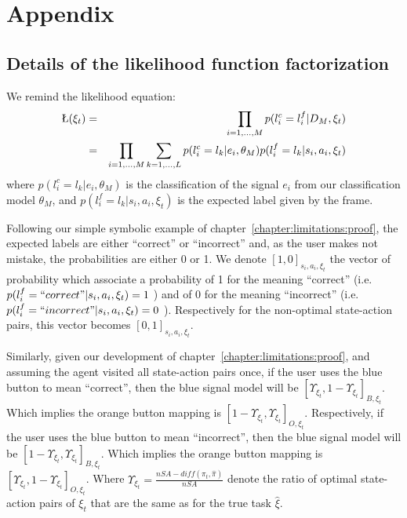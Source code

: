 
\chapter{Appendix}
\label{appendix}

\section{Details of the likelihood function factorization}
\label{appendix:proof}

We remind the likelihood equation:
%
\begin{eqnarray}
\L(\xi_t) &=& \prod_{i = 1,\ldots,M} p(l^c_i = l^f_i | D_M, \xi_t) \nonumber \\ 
&=& \prod_{i = 1,\ldots,M} \sum_{k = 1, \ldots, L} p(l^c_i = l_k | e_i, \theta_M) p(l^f_i = l_k | s_i, a_i, \xi_t) \nonumber
\end{eqnarray}
%
where $p(l^c_i = l_k | e_i, \theta_M)$ is the classification of the signal $e_i$ from our classification model $\theta_M$, and $p(l^f_i = l_k | s_i, a_i, \xi_t)$ is the expected label given by the frame.

Following our simple symbolic example of chapter~\ref{chapter:limitations:proof}, the expected labels are either ``correct'' or ``incorrect'' and, as the user makes not mistake, the probabilities are either 0 or 1. We denote $[1,0]_{s_i,a_i,\xi_t}$ the vector of probability which associate a probability of 1 for the meaning ``correct'' (i.e. $p(l^f_i = ``correct" | s_i, a_i, \xi_t) = 1$ ) and of 0 for the meaning ``incorrect'' (i.e. $p(l^f_i = ``incorrect" | s_i, a_i, \xi_t) = 0$ ). Respectively for the non-optimal state-action pairs, this vector becomes $[0,1]_{s_i,a_i,\xi_t}$.

Similarly, given our development of chapter~\ref{chapter:limitations:proof}, and assuming the agent visited all state-action pairs once, if the user uses the blue button to mean ``correct'', then the blue signal model will be $[\Upsilon_{\xi_t},1-\Upsilon_{\xi_t}]_{B,\xi_t}$. Which implies the orange button mapping is $[1-\Upsilon_{\xi_t},\Upsilon_{\xi_t}]_{O,\xi_t}$. Respectively, if the user uses the blue button to mean ``incorrect'', then the blue signal model will be $[1-\Upsilon_{\xi_t},\Upsilon_{\xi_t}]_{B,\xi_t}$. Which implies the orange button mapping is $[\Upsilon_{\xi_t},1-\Upsilon_{\xi_t}]_{O,\xi_t}$.  Where $\Upsilon_{\xi_t} = \frac{nSA - diff(\pi_t, \hat{\pi})}{nSA}$ denote the ratio of optimal state-action pairs of $\xi_t$ that are the same as for the true task $\hat{\xi}$.

